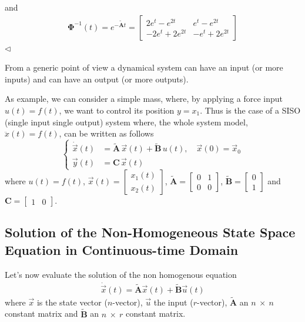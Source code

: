 \documentclass[12pt,a4paper,oneside]{book}
\begin{document}
\begin{onehalfspace}
\begin{example}
\begin{equation}
	\end{equation}
	and
	\begin{equation}
		\begin{aligned}
			\mathbf{\Phi}^{-1}(t) = e^{-\tilde{\mathbf{A}}t} = \left[ \begin{matrix}
				2e^{t}-e^{2t} & e^{t}-e^{2t}\\[8pt]
				-2e^{t}+2e^{2t} & -e^{t}+2e^{2t}
			\end{matrix}\right]
		\end{aligned}
	\end{equation}
$\triangleleft$ 
\end{example}

From a generic point of view a dynamical system can have an input (or more 
inputs) and can  have an output (or more outputs).

As example, we can consider a simple mass, where, by applying a force input $u(t)=f(t)$, we want to control its position $y=x_1$. Thus is the case of a SISO (single input single output) system   where, the whole system model, $\ddot{x}(t)=f(t)$, can be written as follows
\begin{equation}\label{ss_solution_eq11}
	\left\lbrace \begin{aligned}
		\dot{\vec{x}}(t)  &= \tilde{\mathbf{A}} \,\vec{x}(t) +\tilde{\mathbf{B}} \,u(t), \quad\vec{x}(0)=\vec{x}_0 \\[6pt]
		\vec{y}(t)  &= {\mathbf{C}} \,\vec{x}(t)
	\end{aligned}\right. 
\end{equation}
where $u(t)=f(t)$, $\vec{x}(t)=\begin{bmatrix} x_1(t)\\x_2(t) 
\end{bmatrix}$, $\tilde{\mathbf{A}}=\begin{bmatrix} 0&1\\0&0 
\end{bmatrix}$, 
$\tilde{\mathbf{B}}=\begin{bmatrix} 0\\1 \end{bmatrix}$ and 
${\mathbf{C}}=\begin{bmatrix} 1&0 \end{bmatrix}$.

\subsection{Solution of the Non-Homogeneous State Space Equation in 
Continuous-time Domain}
Let's now evaluate the solution of the non homogenous equation 
\begin{equation}\label{ss_solution_eq12}
	\begin{aligned}
		\dot{\vec{x}}(t)=\tilde{\mathbf{A}}\vec{x}(t) + \tilde{\mathbf{B}}\vec{u}(t)
	\end{aligned}
\end{equation}
where $\vec{x}$ is the state vector ($n$-vector), $\vec{u}$ the input ($r$-vector), $\tilde{\mathbf{A}}$ an $n \ \times \ n$ constant matrix and $\tilde{\mathbf{B}}$ an $n \ \times \ r$ constant matrix.


\end{onehalfspace}
\end{document}
